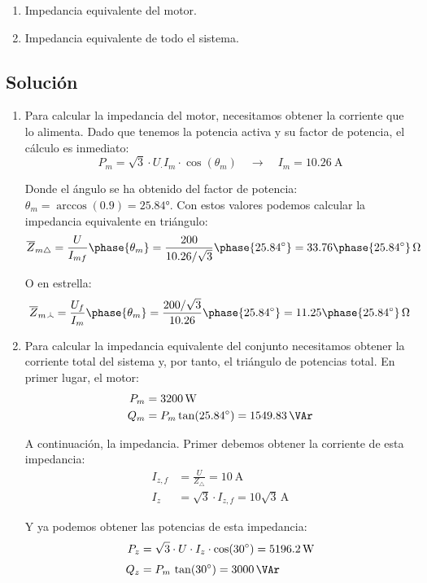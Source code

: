\begin{enumerate}
\item Impedancia equivalente del motor.
\item Impedancia equivalente de todo el sistema.
\end{enumerate}

\subsection*{Solución}

\begin{enumerate}
\item Para calcular la impedancia del motor, necesitamos obtener la corriente que lo alimenta. Dado que tenemos la potencia activa y su factor de potencia, el cálculo es inmediato:
  \[
    P_m = \sqrt{3} \cdot U_ \cdot I_m \cdot \cos(\theta_m) \quad\rightarrow\quad I_m = \qty{10.26}{\ampere}
  \]
  
Donde el ángulo se ha obtenido del factor de potencia: $\theta_m = \arccos(0.9) = \ang{25.84}$.
  Con estos valores podemos calcular la impedancia equivalente en triángulo:
  \[
    \overline{Z}_{m\triangle} = \frac{U}{I_{mf}}\phase{\theta_m} = \frac{200}{10.26/\sqrt{3}}\phase{\ang{25.84}} = 33.76\phase{\ang{25.84}}\,\unit{\ohm}
  \]

  O en estrella:
\[
  \overline{Z}_{m\wye} = \frac{U_f}{I_{m}}\phase{\theta_m} = \frac{200/\sqrt{3}}{10.26}\phase{\ang{25.84}} = 11.25\phase{\ang{25.84}}\,\unit{\ohm}
  \]
 
\item Para calcular la impedancia equivalente del conjunto necesitamos obtener la corriente total del sistema y, por tanto, el triángulo de potencias total. En primer lugar, el motor:
  \begin{align*}
    P_m &= \qty{3200}{\watt}\\
    Q_m &= P_m \tan(25.84^\circ) = \qty{1549.83}{\VAr}
  \end{align*}

  A continuación, la impedancia. Primer debemos obtener la corriente de esta impedancia:
  \begin{align*}
    I_{z,f} &= \frac{U}{Z_\triangle} = \qty{10}{\ampere}\\[3pt]
    I_z &= \sqrt{3}\cdot I_{z,f} = 10\sqrt{3}\,\unit{\ampere}
  \end{align*}
  
  Y ya podemos obtener las potencias de esta impedancia:
  \begin{align*}
    P_z &= \sqrt{3}\cdot U \cdot I_z \cdot \cos(\ang{30}) = \qty{5196.2}{\watt}\\[3pt]
    Q_z &= P_m \, \tan(\ang{30}) = \qty{3000}{\VAr}
  \end{align*}


\end{enumerate}
